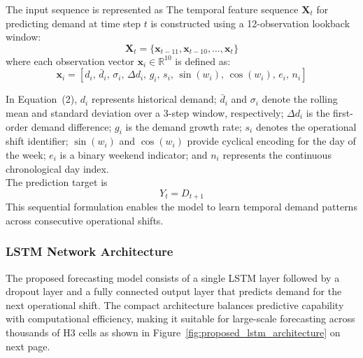 \documentclass{article}
\begin{document}
The input sequence is represented as
The temporal feature sequence $\mathbf{X}_t$ for predicting demand at time step $t$ is constructed using a 12-observation lookback window:
\begin{equation}
    \mathbf{X}_t = \{\mathbf{x}_{t-11}, \mathbf{x}_{t-10}, \dots, \mathbf{x}_t\}
\end{equation}
where each observation vector $\mathbf{x}_i \in \mathbb{R}^{10}$ is defined as:
\begin{equation}
    \mathbf{x}_i = \left[ d_i, \, \bar{d}_i, \, \sigma_i, \, \Delta d_i, \, g_i, \, s_i, \, \sin(w_i), \, \cos(w_i), \, e_i, \, n_i \right]
\end{equation}

In Equation~(2), $d_i$ represents historical demand; $\bar{d}_i$ and $\sigma_i$ denote the rolling mean and standard deviation over a 3-step window, respectively; $\Delta d_i$ is the first-order demand difference; $g_i$ is the demand growth rate; $s_i$ denotes the operational shift identifier; $\sin(w_i)$ and $\cos(w_i)$ provide cyclical encoding for the day of the week; $e_i$ is a binary weekend indicator; and $n_i$ represents the continuous chronological day index. \\
The prediction target is
\begin{equation}
Y_t = D_{t+1}
\end{equation}
This sequential formulation enables the model to learn temporal demand patterns across consecutive operational shifts.

\subsubsection{LSTM Network Architecture}
\label{subsec:lstm_network_architecture}

The proposed forecasting model consists of a single LSTM layer followed by a dropout layer and a fully connected output layer that predicts demand for the next operational shift. The compact architecture balances predictive capability with computational efficiency, making it suitable for large-scale forecasting across thousands of H3 cells as shown in Figure~\ref{fig:proposed_lstm_architecture} on next page.
\end{document}
